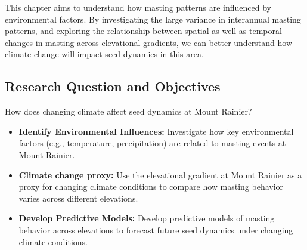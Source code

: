\documentclass[11pt,letter]{article}
\begin{document}
This chapter aims to understand how masting patterns are influenced by environmental factors. By investigating the large variance in interannual masting patterns, and exploring the relationship between spatial as well as temporal changes in masting across elevational gradients, we can better understand how climate change will impact seed dynamics in this area.\par

\subsection{Research Question and Objectives}
How does changing climate affect seed dynamics at Mount Rainier?
\begin{itemize}
\item\textbf{Identify Environmental Influences:} Investigate how key environmental factors (e.g., temperature, precipitation) are related to masting events at Mount Rainier.
\item\textbf{Climate change proxy:} Use the elevational gradient at Mount Rainier as a proxy for changing climate conditions to compare how masting behavior varies across different elevations.
\item\textbf{Develop Predictive Models:} Develop predictive models of masting behavior across elevations to forecast future seed dynamics under changing climate conditions.
\end{itemize}
\end{document}

